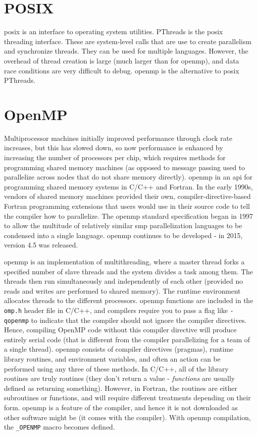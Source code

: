 \documentclass[10pt]{article}
\begin{document}
\begin{flushleft}
\section{POSIX}

\gls{posix} is an interface to operating system utilities. PThreads is the \gls{posix} threading interface. These are system-level calls that are use to create parallelism and synchronize threads. They can be used for multiple languages. However, the overhead of thread creation is large (much larger than for \gls{openmp}), and data race conditions are very difficult to debug. \gls{openmp} is the alternative to \gls{posix} PThreads.
 
\section{OpenMP}

Multiprocessor machines initially improved performance through clock rate increases, but this has slowed down, so now performance is enhanced by increasing the number of processors per chip, which requires methods for programming shared memory machines (as opposed to message passing used to parallelize across nodes that do not share memory directly). \gls{openmp} in an \gls{api} for programming shared memory systems in C/C++ and Fortran. In the early 1990s, vendors of shared memory machines provided their own, compiler-directive-based Fortran programming extensions that users would use in their source code to tell the compiler how to parallelize. The \gls{openmp} standard specification began in 1997 to allow the multitude of relatively similar \gls{smp} parallelization languages to be condensed into a single language. \gls{openmp} continues to be developed - in 2015, version 4.5 was released.

 \gls{openmp} is an implementation of multithreading, where a master thread forks a specified number of slave threads and the system divides a task among them. The threads then run simultaneously and independently of each other (provided no reads and writes are performed to shared memory). The runtime environment allocates threads to the different processors. \gls{openmp} functions are included in the {\tt omp.h} header file in C/C++, and compilers require you to pass a flag like {\tt -qopenmp} to indicate that the compiler should not ignore the compiler directives. Hence, compiling OpenMP code without this compiler directive will produce entirely serial code (that is different from the compiler parallelizing for a team of a single thread). \gls{openmp} consists of compiler directives (pragmas), runtime library routines, and environment variables, and often an action can be performed using any three of these methods. In C/C++, all of the library routines are truly routines (they don't return a value - \textit{functions} are usually defined as returning something). However, in Fortran, the routines are either subroutines or functions, and will require different treatments depending on their form. \gls{openmp} is a feature of the compiler, and hence it is not downloaded as other software might be (it comes with the compiler). With \gls{openmp} compilation, the {\tt \_OPENMP} macro becomes defined.


\end{flushleft}
\end{document}
